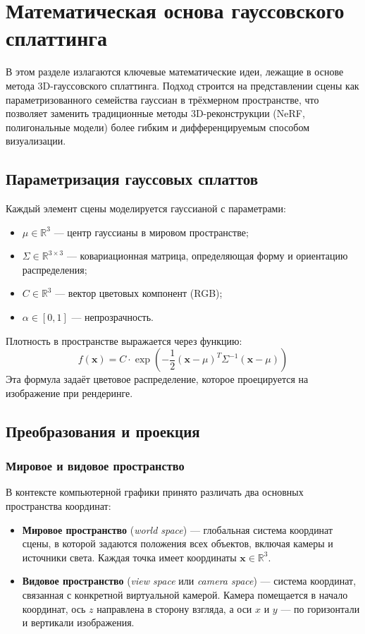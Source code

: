 \chapter{Математическая основа гауссовского сплаттинга}
\label{cha:analysis}

В этом разделе излагаются ключевые математические идеи, лежащие в основе метода 3D-гауссовского сплаттинга. Подход строится на представлении сцены как параметризованного семейства гауссиан в трёхмерном пространстве, что позволяет заменить традиционные методы 3D-реконструкции (NeRF, полигональные модели) более гибким и дифференцируемым способом визуализации.

\section{Параметризация гауссовых сплаттов}

Каждый элемент сцены моделируется гауссианой с параметрами:

\begin{itemize}
  \item $\mu \in \mathbb{R}^3$ — центр гауссианы в мировом пространстве;
  \item $\Sigma \in \mathbb{R}^{3 \times 3}$ — ковариационная матрица, определяющая форму и ориентацию распределения;
  \item $C \in \mathbb{R}^3$ — вектор цветовых компонент (RGB);
  \item $\alpha \in [0, 1]$ — непрозрачность.
\end{itemize}

Плотность в пространстве выражается через функцию:
\[
f(\mathbf{x}) = C \cdot \exp\left(-\frac{1}{2} (\mathbf{x} - \mu)^T \Sigma^{-1} (\mathbf{x} - \mu)\right)
\]
Эта формула задаёт цветовое распределение, которое проецируется на изображение при рендеринге.

\section{Преобразования и проекция}

\subsection{Мировое и видовое пространство}

В контексте компьютерной графики принято различать два основных пространства координат:

\begin{itemize}
  \item \textbf{Мировое пространство} (\textit{world space}) — глобальная система координат сцены, в которой задаются положения всех объектов, включая камеры и источники света. Каждая точка имеет координаты $\mathbf{x} \in \mathbb{R}^3$.
  \item \textbf{Видовое пространство} (\textit{view space} или \textit{camera space}) — система координат, связанная с конкретной виртуальной камерой. Камера помещается в начало координат, ось $z$ направлена в сторону взгляда, а оси $x$ и $y$ — по горизонтали и вертикали изображения.
\end{itemize}

